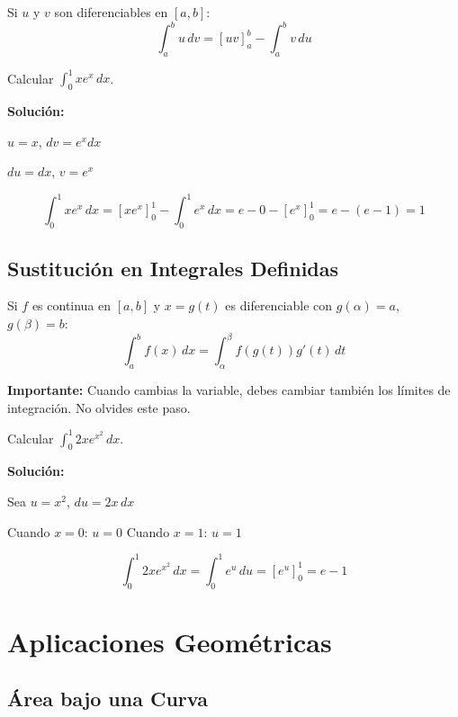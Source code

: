 \documentclass[12pt, a4paper]{book}
\begin{document}
\begin{teorema}
Si $u$ y $v$ son diferenciables en $[a,b]$:
\[
\int_a^b u \, dv = [uv]_a^b - \int_a^b v \, du
\]
\end{teorema}

\begin{ejemplo}
Calcular $\int_0^1 x e^x \, dx$.

\textbf{Solución:}

$u = x$, $dv = e^x dx$

$du = dx$, $v = e^x$

\[
\int_0^1 x e^x \, dx = [x e^x]_0^1 - \int_0^1 e^x \, dx = e - 0 - [e^x]_0^1 = e - (e - 1) = 1
\]
\end{ejemplo}

\section{Sustitución en Integrales Definidas}

\begin{teorema}
Si $f$ es continua en $[a,b]$ y $x = g(t)$ es diferenciable con $g(\alpha) = a$, $g(\beta) = b$:
\[
\int_a^b f(x) \, dx = \int_\alpha^\beta f(g(t)) g'(t) \, dt
\]
\end{teorema}

\begin{nota}
\textbf{Importante:} Cuando cambias la variable, debes cambiar también los límites de integración. No olvides este paso.
\end{nota}

\begin{ejemplo}
Calcular $\int_0^1 2x e^{x^2} \, dx$.

\textbf{Solución:}

Sea $u = x^2$, $du = 2x \, dx$

Cuando $x = 0$: $u = 0$
Cuando $x = 1$: $u = 1$

\[
\int_0^1 2x e^{x^2} \, dx = \int_0^1 e^u \, du = [e^u]_0^1 = e - 1
\]
\end{ejemplo}

\chapter{Aplicaciones Geométricas}

\section{Área bajo una Curva}
\end{document}
